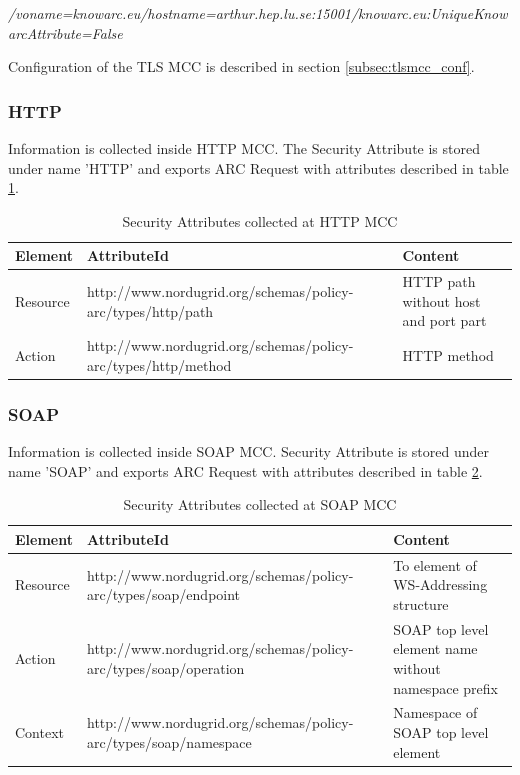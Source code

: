 \documentclass{article}                            %
\begin{document}
\emph{/voname=knowarc.eu/hostname=arthur.hep.lu.se:15001/knowarc.eu:UniqueKnowarcAttribute=False}

Configuration of the TLS MCC is described in section \ref{subsec:tlsmcc_conf}.



\subsubsection{HTTP} %
\label{subsubsec:sec_attr_HTTP}
Information is collected inside HTTP MCC. The Security Attribute is stored under name 'HTTP' and exports ARC Request with attributes described in table \ref{table:http_attr}.

\begin{table}[h]
\caption{Security Attributes collected at HTTP MCC}
\centering
\begin{tabular}{| l | p{7cm} | p{5cm} |}
\hline
\textbf{Element} & \textbf{AttributeId} & \textbf{Content} \\ \hline
Resource & http://www.nordugrid.org/schemas/policy-arc/types/http/path & HTTP path without host and port part \\ \hline
Action & http://www.nordugrid.org/schemas/policy-arc/types/http/method & HTTP method \\ \hline
\end{tabular}
\label{table:http_attr}
\end{table}


\subsubsection{SOAP} %
\label{subsubsec:sec_attr_SOAP}
Information is collected inside SOAP MCC. Security Attribute is stored under name 'SOAP' and exports ARC Request with attributes described in table \ref{table:soap_attr}.

\begin{table}[h]
\caption{Security Attributes collected at SOAP MCC}
\centering
\begin{tabular}{| l | p{7cm} | p{5cm} |}
\hline
\textbf{Element} & \textbf{AttributeId} & \textbf{Content} \\ \hline
Resource & http://www.nordugrid.org/schemas/policy-arc/types/soap/endpoint & To element of WS-Addressing structure \\ \hline
Action & http://www.nordugrid.org/schemas/policy-arc/types/soap/operation & SOAP top level element name without namespace prefix \\ \hline
Context & http://www.nordugrid.org/schemas/policy-arc/types/soap/namespace & Namespace of SOAP top level element \\ \hline
\end{tabular}
\label{table:soap_attr}
\end{table}
\end{document}

